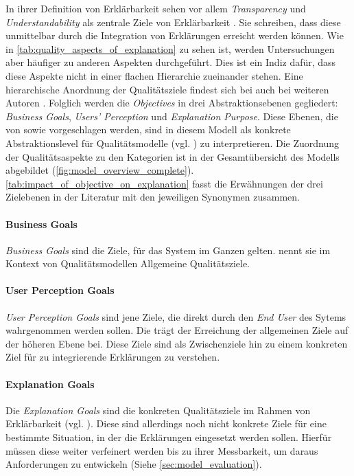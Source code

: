 In ihrer Definition von Erklärbarkeit sehen \citeauthor{chazette_knowledge_nodate} vor allem \textit{Transparency} und \textit{Understandability} als zentrale Ziele von Erklärbarkeit \cite{chazette_end-users_nodate}. Sie schreiben, dass diese unmittelbar durch die Integration von Erklärungen erreicht werden können. Wie in \autoref{tab:quality_aspects_of_explanation} zu sehen ist, werden Untersuchungen aber häufiger zu anderen Aspekten durchgeführt. Dies ist ein Indiz dafür, dass diese Aspekte nicht in einer flachen Hierarchie zueinander stehen. Eine hierarchische Anordnung der Qualitätsziele findest sich bei auch bei weiteren Autoren \cite{nunes_systematic_2017,tintarev2007survey}. Folglich werden die \textit{Objectives} in drei Abstraktionsebenen gegliedert: \textit{Business Goals}, \textit{Users' Perception} und \textit{Explanation Purpose}. Diese Ebenen, die von \citeauthor{nunes_systematic_2017} sowie \citeauthor{tintarev2007survey} vorgeschlagen werden, sind in diesem Modell als konkrete Abstraktionslevel für Qualitätsmodelle (vgl. \cite{schneider2012abenteuer}) zu interpretieren. Die Zuordnung der Qualitätsaspekte zu den Kategorien ist in der Gesamtübersicht des Modells abgebildet (\autoref{fig:model_overview_complete}). \autoref{tab:impact_of_objective_on_explanation} fasst die Erwähnungen der drei Zielebenen in der Literatur mit den jeweiligen Synonymen zusammen.

\paragraph{Business Goals} \textit{Business Goals} sind die Ziele, für das System im Ganzen gelten. \citeauthor{schneider2012abenteuer} nennt sie im Kontext von Qualitätsmodellen \glqq Allgemeine Qualitätsziele\grqq \cite{schneider2012abenteuer}.

\paragraph{User Perception Goals} \textit{User Perception Goals} sind jene Ziele, die direkt durch den \textit{End User} des Sytems wahrgenommen werden sollen. Die trägt der Erreichung der allgemeinen Ziele auf der höheren Ebene bei. Diese Ziele sind als Zwischenziele hin zu einem konkreten Ziel für zu integrierende Erklärungen zu verstehen.

\paragraph{Explanation Goals} Die \textit{Explanation Goals} sind die \glqq konkreten Qualitätsziele\grqq{} im Rahmen von Erklärbarkeit (vgl. \cite{schneider2012abenteuer}). Diese sind allerdings noch nicht konkrete Ziele für eine bestimmte Situation, in der die Erklärungen eingesetzt werden sollen. Hierfür müssen diese weiter verfeinert werden bis zu ihrer Messbarkeit, um daraus Anforderungen zu entwickeln (Siehe \autoref{sec:model_evaluation}).

